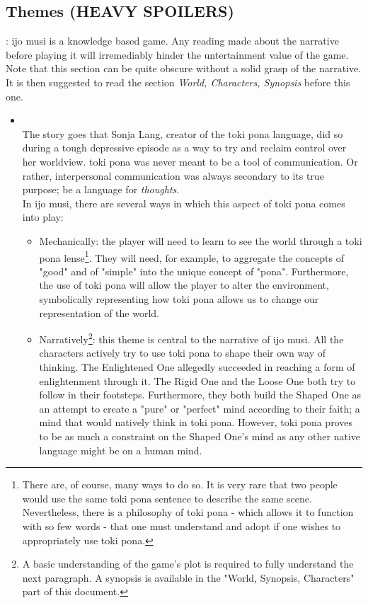 \documentclass{scrartcl}
\let\emph\relax %
\begin{document}
		\subsection{Themes (HEAVY SPOILERS)}
			\emph{CAUTION}: ijo musi is a knowledge based game. Any reading made about the narrative before playing it will irremediably hinder the untertainment value of the game.\\
			Note that this section can be quite obscure without a solid grasp of the narrative. It is then suggested to read the section \textit{World, Characters, Synopsis} before this one.
			\begin{itemize}
				\item \emph{Language as a way to relate to the world}\\
					The story goes that Sonja Lang, creator of the toki pona language, did so during a tough depressive episode as a way to try and reclaim control over her worldview. toki pona was never meant to be a tool of communication. Or rather, interpersonal communication was always secondary to its true purpose; be a language for \textit{thoughts}.\\
					In ijo musi, there are several ways in which this aspect of toki pona comes into play:
					\begin{itemize}
						\item Mechanically:
							the player will need to learn to see the world through a toki pona lense\footnote{There are, of course, many ways to do so. It is very rare that two people would use the same toki pona sentence to describe the same scene. Nevertheless, there is a philosophy of toki pona - which allows it to function with so few words - that one must understand and adopt if one wishes to appropriately use toki pona.}. They will need, for example, to aggregate the concepts of "good" and of "simple" into the unique concept of "pona". Furthermore, the use of toki pona will allow the player to alter the environment, symbolically representing how toki pona allows us to change our representation of the world.
						\item Narratively\footnote{A basic understanding of the game's plot is required to fully understand the next paragraph. A synopsis is available in the "World, Synopsis, Characters" part of this document.}: 
							this theme is central to the narrative of ijo musi. All the characters actively try to use toki pona to shape their own way of thinking. The Enlightened One allegedly succeeded in reaching a form of enlightenment through it. The Rigid One and the Loose One both try to follow in their footsteps. Furthermore, they both build the Shaped One as an attempt to create a "pure" or "perfect" mind according to their faith; a mind that would natively think in toki pona. However, toki pona proves to be as much a constraint on the Shaped One's mind as any other native language might be on a human mind.

\end{itemize}
\end{itemize}
\end{document}
